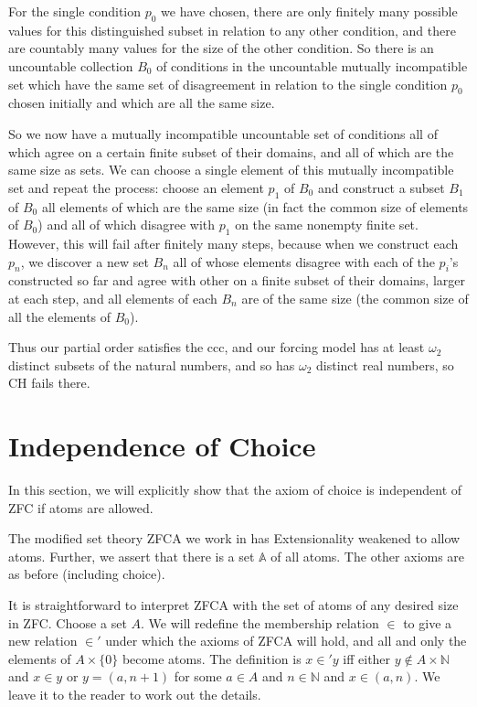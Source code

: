 \documentclass[12pt]{book}
\begin{document}
For the single condition $p_0$ we have chosen, there are only finitely many possible values for this distinguished subset in relation to any other condition, and there are countably many values for the size of the other condition.  So there is an uncountable collection $B_0$  of conditions in the uncountable mutually incompatible set which have the same set of disagreement
in relation to the single condition $p_0$ chosen initially and which are all the same size.

So we now have a mutually incompatible uncountable set of conditions all of which agree on a certain finite subset of their domains, and all of which are the same size as sets.
We can choose a single element of this mutually incompatible set and repeat the process:  choose an element $p_1$ of $B_0$ and construct a subset $B_1$ of $B_0$ all elements of which are the same size (in fact the common size of elements of $B_0$) and all of which disagree with $p_1$ on the same nonempty finite set.  However, this will fail after finitely many steps, because when we construct each $p_n$, we discover a new set $B_n$ all of whose elements disagree with each of the $p_i$'s constructed so far and agree with other
on a finite subset of their domains, larger at each step, and all elements of each $B_n$ are of the same size (the common size of all the elements of $B_0$).

Thus our partial order satisfies the ccc, and our forcing model has at least $\omega_2$ distinct subsets of the natural numbers, and so has $\omega_2$ distinct real numbers, so CH fails there.

\newpage

\section{Independence of Choice}

In this section, we will explicitly show that the axiom of choice is independent of ZFC if atoms are allowed.

The modified set theory ZFCA we work in has Extensionality weakened to allow atoms.  Further, we assert that there is a set $\mathbb A$ of all atoms.  The other axioms are as before (including choice).

It is straightforward to interpret ZFCA with the set of atoms of any desired size in ZFC.  Choose a set $A$.  We will redefine the membership relation $\in$ to give a new relation $\in'$ under which the axioms of ZFCA will hold, and all and only the elements of $A \times \{0\}$ become atoms.  The definition is $x \in' y$ iff either $y \not\in A \times \mathbb N$ and $x \in y$ or $y = (a,n+1)$ for some $a \in A$ and $n \in \mathbb N$ and $x \in (a,n)$.   We leave it to the reader to work out the details.
\end{document}
